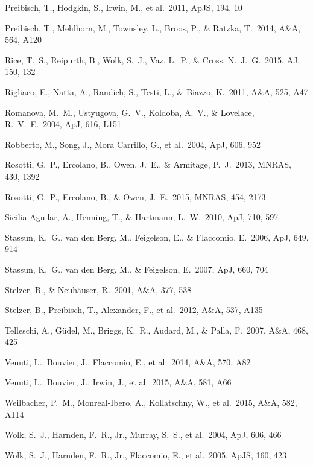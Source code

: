 \documentclass[10pt,fleqn,twoside]{article}
\newcommand*\aap{A\&A}
\newcommand*\aj{AJ}
\newcommand*\apj{ApJ}
\newcommand*\apjl{ApJ}
\newcommand*\apjs{ApJS}
\newcommand*\mnras{MNRAS}
\begin{document}
\begin{thebibliography}{}
 Preibisch, T., Hodgkin, S., Irwin, M., et al.\ 2011, \apjs, 194, 10

 Preibisch, T., Mehlhorn, M., Townsley, L., Broos, P., \& Ratzka, T.\ 2014, \aap, 564, A120

 Rice, T.~S., Reipurth, B., Wolk, S.~J., Vaz, L.~P., \& Cross, N.~J.~G.\ 2015, \aj, 150, 132 

 Rigliaco, E., Natta, A., Randich, S., Testi, L., \& Biazzo, K.\ 2011, \aap, 525, A47

 Romanova, M.~M., Ustyugova, G.~V., Koldoba, A.~V., \& Lovelace, R.~V.~E.\ 2004, \apjl, 616, L151

 Robberto, M., Song, J., Mora Carrillo, G., et al.\ 2004, \apj, 606, 952 

 Rosotti, G.~P., Ercolano, B., Owen, J.~E., \& Armitage, P.~J.\ 2013, \mnras, 430, 1392

 Rosotti, G.~P., Ercolano, B., \& Owen, J.~E.\ 2015, \mnras, 454, 2173 


 Sicilia-Aguilar, A., Henning, T., \& Hartmann, L.~W.\ 2010, \apj, 710, 597 

 Stassun, K.~G., van den Berg, M., Feigelson, E., \& Flaccomio, E.\ 2006, \apj, 649, 914 

 Stassun, K.~G., van den Berg, M., \& Feigelson, E.\ 2007, \apj, 660, 704 

 Stelzer, B., \& Neuh{\"a}user, R.\ 2001, \aap, 377, 538

 Stelzer, B., Preibisch, T., Alexander, F., et al.\ 2012, \aap, 537, A135

 Telleschi, A., G{\"u}del, M., Briggs, K.~R., Audard, M., \& Palla, F.\ 2007, \aap, 468, 425 

 Venuti, L., Bouvier, J., Flaccomio, E., et al.\ 2014, \aap, 570, A82 

 Venuti, L., Bouvier, J., Irwin, J., et al.\ 2015, \aap, 581, A66 

 Weilbacher, P.~M., Monreal-Ibero, A., Kollatschny, W., et al.\ 2015, \aap, 582, A114 

 Wolk, S.~J., Harnden, F.~R., Jr., Murray, S.~S., et al.\ 2004, \apj, 606, 466

 Wolk, S.~J., Harnden, F.~R., Jr., Flaccomio, E., et al.\ 2005, \apjs, 160, 423 
\end{thebibliography}
\end{document}
